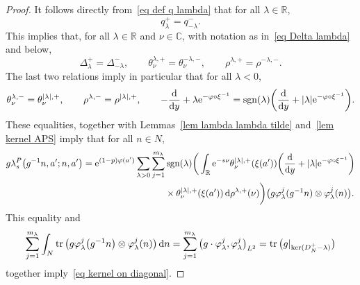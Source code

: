 \documentclass[10pt,a4paper]{amsart}
\numberwithin{equation}{section}
\DeclareMathOperator{\tr}{tr}
\DeclareMathOperator{\sgn}{sgn}
\newcommand{\R}{\mathbb{R}}
\newcommand{\C}{\mathbb{C}}
\begin{document}
\begin{proof}
It follows directly from~\eqref{eq def q lambda} that for all $\lambda \in \R$,
\[
q^{+}_{\lambda} = q^{-}_{-\lambda}.
\]
This implies that, for all $\lambda \in \R$ and $\nu \in \C$, with notation as in~\eqref{eq Delta lambda} and below,
\[
\Delta^+_{\lambda}= \Delta^-_{-\lambda},\qquad
\theta^{\lambda, +}_{\nu} = \theta^{-\lambda,-}_{\nu},\qquad
\rho^{\lambda, +} = \rho^{-\lambda, -}.
\]
The last two relations imply in particular that for all $\lambda<0$,
\begin{equation*} %
\theta^{\lambda, -}_{\nu} = \theta^{|\lambda|, +}_{\nu},\qquad
\rho^{\lambda, -} = \rho^{|\lambda|, +},\qquad
 -\frac{\rm d}{{\rm d}y}+\lambda {\rm e}^{-\varphi \circ \xi^{-1}}= \sgn(\lambda) \bigg( \frac{\rm d}{{\rm d}y}+|\lambda| {\rm e}^{-\varphi \circ \xi^{-1}}\bigg).
\end{equation*}
These equalities, together with Lemmas~\ref{lem lambda lambda tilde} and~\ref{lem kernel APS} imply that for all $n \in N$,
\begin{align*}
g \lambda_s^{P}\big(g^{-1}n, a'; n, a'\big) = {\rm e}^{(1-p)\varphi(a')}
\sum_{\lambda >0} \sum_{j=1}^{m_{\lambda}} &\sgn(\lambda)
\bigg(\int_{\R}
{\rm e}^{-s\nu} \theta^{|\lambda|, +}_{\nu} (\xi(a')) \bigg( \frac{\rm d}{{\rm d}y}+|\lambda| {\rm e}^{-\varphi \circ \xi^{-1}}\bigg)
\\
& \times\theta^{|\lambda|, +}_{\nu} (\xi(a'))\, {\rm d}\rho^{\lambda, +}(\nu) \bigg)
\big(g \varphi_{\lambda}^j (g^{-1}n) \otimes \varphi_{\lambda}^j (n) \big).
\end{align*}
This equality and
\[
\sum_{j=1}^{m_{\lambda}}
\int_{N} \tr\big(g\varphi_{\lambda}^j\big(g^{-1}n\big) \otimes \varphi_{\lambda}^j(n)\big) \, {\rm d}n =
\sum_{j=1}^{m_{\lambda}} \big(g\cdot \varphi_{\lambda}^j, \varphi_{\lambda}^j\big)_{L^2} = \tr\big(g|_{\ker(D_N^+ - \lambda)}\big)
\]
together
imply~\eqref{eq kernel on diagonal}.
\end{proof}
\end{document}
